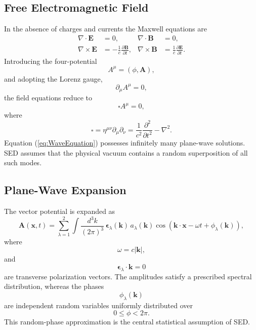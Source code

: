 \subsection{Free Electromagnetic Field}
In the absence of charges and currents the Maxwell equations are
\begin{align}
\nabla\cdot\mathbf E &=0,
    &\nabla\cdot\mathbf B &=0,\\
\nabla\times\mathbf E&=-\frac1c\frac{\partial\mathbf B}{\partial t},
&\nabla\times\mathbf B&=\frac1c\frac{\partial\mathbf E}{\partial t}.
\end{align}
Introducing the four-potential
\[A^\mu=(\phi,\mathbf A),\]
and adopting the Lorenz gauge,
\[\partial_\mu A^\mu=0,\]
the field equations reduce to
\begin{equation}
\square A^\mu=0,
\label{eq:WaveEquation}
\end{equation}
where
\[\square=\eta^{\mu\nu}\partial_\mu\partial_\nu
=\frac1{c^2}\frac{\partial^2}{\partial t^2}-\nabla^2.\]
Equation (\ref{eq:WaveEquation}) possesses infinitely many plane-wave
solutions.
SED assumes that the physical vacuum contains a random superposition of
all such modes.
\subsection{Plane-Wave Expansion}
The vector potential is expanded as
\begin{equation}
\mathbf A(\mathbf x,t)=\sum_{\lambda=1}^{2}
\int\frac{d^3k}{(2\pi)^3}\,
\boldsymbol{\epsilon}_{\lambda}(\mathbf k)\,
a_{\lambda}(\mathbf k)\cos\left(\mathbf k\cdot\mathbf x-\omega t
+\phi_{\lambda}(\mathbf k)\right),
\label{eq:RandomExpansion}
\end{equation}
where
\[\omega=c|\mathbf k|,\]
and
\[\boldsymbol{\epsilon}_{\lambda}\cdot\mathbf k=0\]
are transverse polarization vectors.
The amplitudes satisfy a prescribed spectral distribution, whereas the
phases
\[\phi_{\lambda}(\mathbf k)\]
are independent random variables uniformly distributed over
\[0\le\phi<2\pi.\]
This random-phase approximation is the central statistical assumption of
SED.
